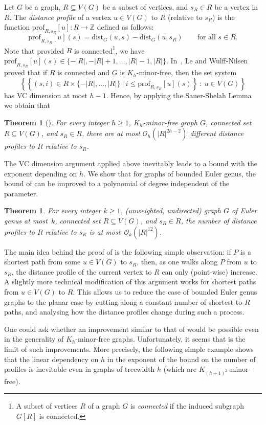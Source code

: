 \documentclass[11pt,a4paper]{article}
\newtheorem{theorem}[lemma]{Theorem}
\newcommand{\Oh}{\mathcal{O}}
\newcommand{\distprofile}[3]{\mathrm{prof}_{#1,#2}[#3]}
\newcommand{\dist}{\mathrm{dist}}
\renewcommand{\leq}{\leqslant}
\renewcommand{\geq}{\geqslant}
\begin{document}
Let $G$ be a graph, $R \subseteq V(G)$ be a subset of vertices, and $s_R \in R$ be a vertex in $R$.
The \emph{distance profile} of a vertex $u \in V(G)$ to $R$ (relative to $s_R$)
  is the function $\distprofile{R}{s_R}{u} \colon R \to \mathbb{Z}$ defined as follows:
  \[ \distprofile{R}{s_R}{u}(s) = \dist_G(u,s) - \dist_G(u,s_R)\qquad \textrm{for all }s\in R. \]
Note that provided $R$ is connected\footnote{A subset of vertices $R$ of a graph $G$ is {\em{connected}} if the induced subgraph $G[R]$ is connected.}, we have
$\distprofile{R}{s_R}{u}(s) \in \{-|R|,-|R|+1,\ldots,|R|-1,|R|\}$. In~\cite{LeW24},
Le and Wulff-Nilsen proved that if $R$ is connected and $G$ is $K_h$-minor-free, then
the set system $$\left\{ \left\{(s,i) \in R \times \{-|R|,\ldots,|R|\}~|~i \leq \distprofile{R}{s_R}{u}(s)\right\}~\colon~u \in V(G)\right\}$$ has VC dimension at most $h-1$. Hence, by applying the Sauer-Shelah Lemma we obtain that
\begin{theorem}[\cite{LeW24}]\label{thm:distprofiles-LeW24}
For every integer $h\geq 1$, $K_h$-minor-free graph $G$, connected set $R \subseteq V(G)$, and  $s_R \in R$, there are at most $\Oh_h(|R|^{2h-2})$
different distance profiles to $R$ relative to $s_R$. 
\end{theorem}
The VC dimension argument applied above inevitably leads to a bound with the exponent depending on $h$.
We show that for  graphs of bounded Euler genus, the bound of 
can be improved to a polynomial of degree independent of the parameter.
\begin{theorem}\label{thm:distprofiles}
For every integer $k\geq 1$, (unweighted, undirected) graph $G$ of Euler genus at most~$k$, connected set $R \subseteq V(G)$, and $s_R \in R$,
the number of distance profiles to $R$ relative to $s_R$
is at most~$\Oh_k(|R|^{12})$.
\end{theorem}
The main idea behind the proof of  is the following simple
observation:
if $P$ is a shortest path from some $u \in V(G)$ to $s_R$, then, as one walks along $P$
from $u$ to $s_R$, the distance profile of the current vertex to $R$ can only (point-wise) increase.
A slightly more technical modification of this argument works for shortest paths
from $u \in V(G)$ to $R$. This allows us to reduce the case of bounded Euler genus graphs
to the planar case by cutting along a constant number of shortest-to-$R$ paths,
and analysing how the distance profiles change during such a process.

One could ask whether an improvement similar to that of 
would be possible even in the generality of $K_h$-minor-free graphs.
Unfortunately, it seems that  is the limit of such improvements. More precisely, the following simple example shows that the linear dependency on $h$ in the exponent of the bound on the number of profiles is inevitable even in graphs of treewidth $h$ (which are  $K_{(h+1)^2}$-minor-free).
\end{document}
